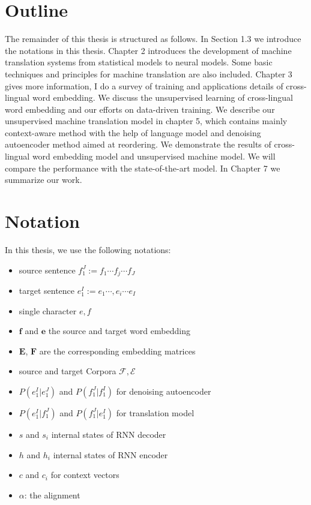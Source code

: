 \section{Outline}
The remainder of this thesis is structured as follows. In Section 1.3 we introduce the notations in this thesis. 
Chapter 2 introduces the development of machine translation systems from statistical models to  neural models. Some basic techniques and principles for machine translation are also included.  Chapter 3 gives more information,  I do a survey of training and applications details of cross-lingual word embedding. We discuss the unsupervised learning of cross-lingual word embedding and our efforts on data-driven training. We describe our unsupervised machine translation model in chapter 5, which contains mainly context-aware method with the help of language model and denoising autoencoder method aimed at reordering. We demonstrate the results of cross-lingual word embedding model and unsupervised machine model. We will compare the performance with the state-of-the-art model. In Chapter 7 we summarize our work.


\section{Notation}
In this thesis, we use the following notations:
\begin{itemize}
	\item source sentence  ${f_1^J:= f_1 \cdots  f_j \cdots f_J}$ 
	\item target sentence  ${e_1^I:= e_1 \cdots, e_i \cdots e_I}$
	\item single character $e,f $
	\item $\bm{f}$ and $\bm{e}$ the source and target word embedding
	\item $\bm{E}$, $\bm{F}$ are the corresponding embedding matrices
	\item source and target Corpora $\mathcal{F}, \mathcal{E}$
	\item $P(e_1^I | e_1^J)$ and ${P(f_1^J |f_1^I)}$ for denoising autoencoder
	\item $P(e_1^I | f_1^J)$ and ${P(f_1^J |e_1^I)}$ for translation model
	\item $s$ and $s_i$  internal states of RNN decoder
	\item $h$ and $h_i$ internal states of RNN encoder 
	\item $c$ and $c_i$ for context vectors
	\item $\alpha$: the alignment 
\end{itemize}










